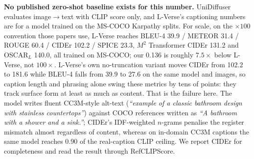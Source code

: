 \begin{table}[tb]
\centering
\footnotesize
\setlength{\tabcolsep}{4pt}
\caption{Zero-shot captioning on the complete Karpathy test split ($n{=}5000$, no empty
captions). Guidance 2.0 maximises the $n$-gram metrics and guidance 4.0 the CLIP-space metrics;
the two families disagree, so both are reported. The entropy-derived grid beats Karras by
$2.81\times$ on CIDEr while RefCLIPScore moves by 0.003.}
\label{tab:app:image:captioning}
\end{table}

\textbf{No published zero-shot baseline exists for this number.} UniDiffuser
\citep{image:unidiffuser} evaluates image$\rightarrow$text with CLIP score only, and L-Verse's
captioning numbers \citep{image:lverse} are for a model trained on the MS-COCO Karpathy splits.
For scale, on the $\times100$ convention those papers use, L-Verse reaches BLEU-4 39.9 / METEOR
31.4 / ROUGE 60.4 / CIDEr 102.2 / SPICE 23.3, $M^2$ Transformer \citep{image:m2transformer} CIDEr
131.2 and OSCAR$_L$ \citep{image:oscar} 140.0, all trained on MS-COCO; our 0.136 is roughly
$7.5\times$ below L-Verse, not $100\times$. L-Verse's own no-truncation variant moves CIDEr from
102.2 to 181.6 while BLEU-4 falls from 39.9 to 27.6 on the same model and images, so caption
length and phrasing alone swing these metrics by tens of points: they track surface form at least
as much as content. That is the failure here. The model writes fluent CC3M-style alt-text
(\emph{``example of a classic bathroom design with stainless countertops''}) against COCO
references written as \emph{``A bathroom with a shower and a sink.''}; CIDEr's IDF-weighted
$n$-grams penalise the register mismatch almost regardless of content, whereas on in-domain CC3M
captions the same model reaches 0.90 of the real-caption CLIP ceiling. We report CIDEr for
completeness and read the result through RefCLIPScore.

